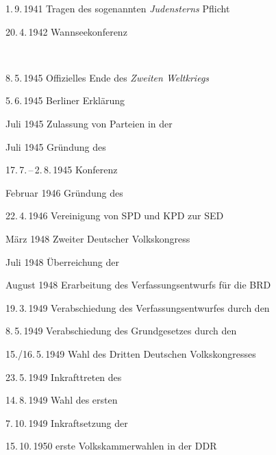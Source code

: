 \begin{chronik}
\item[1.\,9.\,1941]
Tragen des sogenannten \emph{Judensterns} Pflicht

\item[20.\,4.\,1942]
Wannseekonferenz

\ \\

\item[8.\,5.\,1945]
Offizielles Ende des \emph{Zweiten Weltkriegs}

\item[5.\,6.\,1945]
Berliner Erklärung

\item[Juli 1945]
Zulassung von Parteien in der \textsf{}

\item[Juli 1945]
Gründung des 

\item[17.\,7.\,--\,2.\,8.\,1945]
 Konferenz

\item[Februar 1946]
Gründung des 

\item[22.\,4.\,1946]
Vereinigung von SPD und KPD zur SED

\item[März 1948]
Zweiter Deutscher Volkskongress

\item[Juli 1948]
Überreichung der 

\item[August 1948]
Erarbeitung des Verfassungsentwurfs für die BRD

\item[19.\,3.\,1949]
Verabschiedung des Verfassungsentwurfes durch den 

\item[8.\,5.\,1949]
Verabschiedung des Grundgesetzes durch den 

\item[15./16.\,5.\,1949]
Wahl des Dritten Deutschen Volkskongresses

\item[23.\,5.\,1949]
Inkrafttreten des 

\item[14.\,8.\,1949]
Wahl des ersten 

\item[7.\,10.\,1949]
Inkraftsetzung der 

\item[15.\,10.\,1950]
erste Volkskammerwahlen in der DDR
\end{chronik}

\endinput
